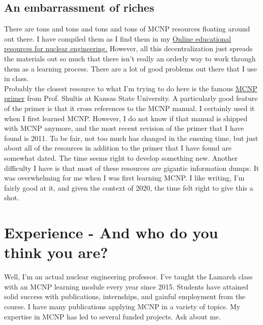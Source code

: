 \documentclass[11pt,a4paper]{article}
\begin{document}
\subsection{An embarrassment of riches}
\noindent There are tons and tons and tons and tons of MCNP resources floating around out there. I have compiled them as I find them in my \href{https://courses.lumenlearning.com/uidaho-nuclear/}{Online educational resources for nuclear engineering.} However, all this decentralization just spreads the materials out so much that there isn't really an orderly way to work through them as a learning process. There are a lot of good problems out there that I use in class. \\

\noindent Probably the closest resource to what I'm trying to do here is the famous \href{https://www.mne.k-state.edu/~jks/MCNPprmr.pdf}{MCNP primer} from Prof. Shultis at Kansas State University. A particularly good feature of the primer is that it cross references to the MCNP manual. I certainly used it when I first learned MCNP. However, I do not know if that manual is shipped with MCNP anymore, and the most recent revision of the primer that I have found is 2011. To be fair, not too much has changed in the ensuing time, but just about all of the resources in addition to the primer that I have found are somewhat dated. The time seems right to develop something new. Another difficulty I have is that most of these resources are gigantic information dumps. It was overwhelming for me when I was first learning MCNP. I like writing, I'm fairly good at it, and given the context of 2020, the time felt right to give this a shot. \\

\newpage


\section{Experience - And who do you think you are?} \label{experience}
\noindent Well, I'm an actual nuclear engineering professor. I've taught the Lamarsh class with an MCNP learning module every year since 2015. Students have attained solid success with publications, internships, and gainful employment from the course. I have many publications applying MCNP in a variety of topics. My expertise in MCNP has led to several funded projects. Ask about me. \\
\end{document}
